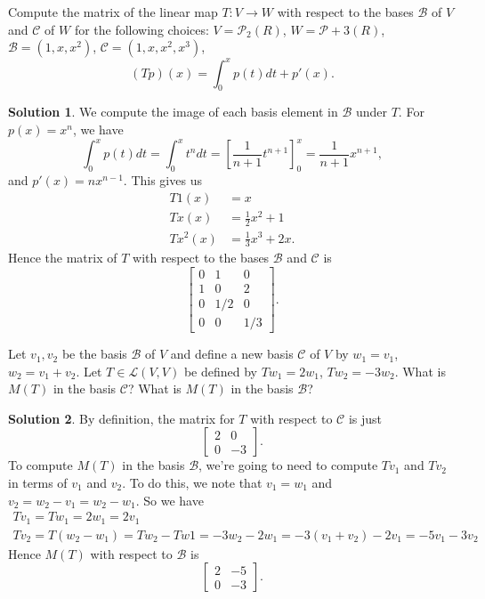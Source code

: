 \documentclass[12pt]{article}
\theoremstyle{definition}
\theoremstyle{definition}
\newtheorem*{soln}{Solution}
\begin{document}
\break

\begin{prob}
Compute the matrix of the linear map $T:V\to W$ with respect to the bases $\mathcal{B}$ of $V$ and $\mathcal{C}$ of $W$ for the following choices: $V=\mathcal{P}_2(R)$, $W=\mathcal{P}+3(R)$, $\mathcal{B}=(1,x,x^2)$, $\mathcal{C}=(1,x,x^2,x^3)$,
\[(Tp)(x) =\int_0^x p(t)dt+p'(x).\]
\end{prob}

\begin{soln}
We compute the image of each basis element in $\mathcal{B}$ under $T$. For $p(x)=x^n$, we have
\[\int_0^xp(t)dt=\int_0^x t^ndt=\left[\frac{1}{n+1}t^{n+1}\right]_0^x=\frac{1}{n+1}x^{n+1},\]
and $p'(x)=nx^{n-1}$. This gives us
\begin{align*}
T1(x) &= x\\
Tx(x) &= \frac{1}{2}x^2+1\\
Tx^2(x) &= \frac{1}{3}x^3+2x.
\end{align*}
Hence the matrix of $T$ with respect to the bases $\mathcal{B}$ and $\mathcal{C}$ is
\[\begin{bmatrix} 0 & 1 & 0 \\ 1 & 0 & 2 \\ 0 & 1/2 & 0 \\ 0 & 0 & 1/3 \end{bmatrix}.\]
\end{soln}

\break

\begin{prob}
Let $v_1,v_2$ be  the  basis $\mathcal{B}$ of $V$ and  define a new  basis $\mathcal{C}$ of $V$ by $w_1=v_1$, $w_2=v_1+v_2$. Let $T\in\mathcal{L}(V,V)$ be defined by $Tw_1=2w_1$, $Tw_2=-3w_2$. What is $M(T)$ in the basis $\mathcal{C}$? What is $M(T)$ in the basis $\mathcal{B}$?
\end{prob}

\begin{soln}
By definition, the matrix for $T$ with respect to $\mathcal{C}$ is just
\[\begin{bmatrix} 2 & 0 \\ 0 & -3 \end{bmatrix}.\]
To compute $M(T)$ in the basis $\mathcal{B}$, we're going to need to compute $Tv_1$ and $Tv_2$ in terms of $v_1$ and $v_2$. To do this, we note that $v_1=w_1$ and $v_2=w_2-v_1=w_2-w_1$. So we have
\begin{gather*}
Tv_1 = Tw_1 = 2w_1 = 2v_1 \\
Tv_2 = T(w_2-w_1) = Tw_2-Tw1 = -3w_2-2w_1 = -3(v_1+v_2)-2v_1 = -5v_1-3v_2
\end{gather*}
Hence $M(T)$ with respect to $\mathcal{B}$ is 
\[\begin{bmatrix} 2 & -5 \\ 0 & -3 \end{bmatrix}.\]
\end{soln}
\end{document}
